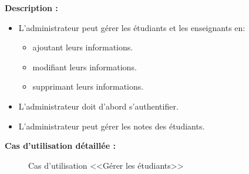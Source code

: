 \documentclass[12pt]{report}
\begin{document}
\vspace{0.2in}

\textbf{Description :}

\begin{itemize}
    \item L'administrateur peut gérer les étudiants et les enseignants en:
\begin{itemize}
    \item ajoutant leurs informations.
    \item modifiant leurs informations.
    \item supprimant leurs informations.
\end{itemize}
    \item L'administrateur doit d'abord s'authentifier.
    \item L'administrateur peut gérer les notes des étudiants.
\end{itemize}

\newpage

\textbf{Cas d'utilisation détaillée :}

\begin{figure}[h]
\centering
    \centerline{}
    \caption{Cas d'utilisation <<Gérer les étudiants>>}
\end{figure}

\vspace{-0.1in}
\end{document}
